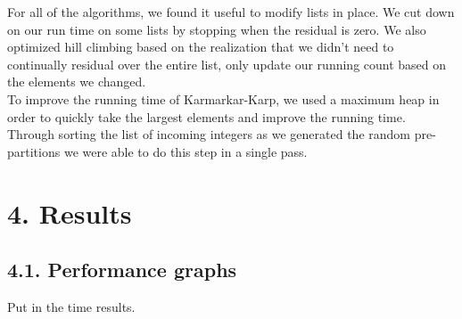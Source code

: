 \documentclass{article}
\begin{document}
For all of the algorithms, we found it useful to modify lists in place. We cut down on our run time on some lists by stopping when the residual is zero. We also optimized hill climbing based on the realization that we didn't need to continually residual over the entire list, only update our running count based on the elements we changed.\\

To improve the running time of Karmarkar-Karp, we used a maximum heap in order to quickly take the largest elements and improve the running time. Through sorting the list of incoming integers as we generated the random pre-partitions we were able to do this step in a single pass. 
\newpage
\section*{4. Results} 
\subsection*{4.1. Performance graphs}

Put in the time results. \\ 
\end{document}
